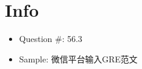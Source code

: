 \documentclass{article}
\begin{document}
  \section{Info}
    \begin{itemize}
      \item Question \#: 56.3
      \item Sample: 微信平台输入GRE范文
    \end{itemize}
\end{document}
